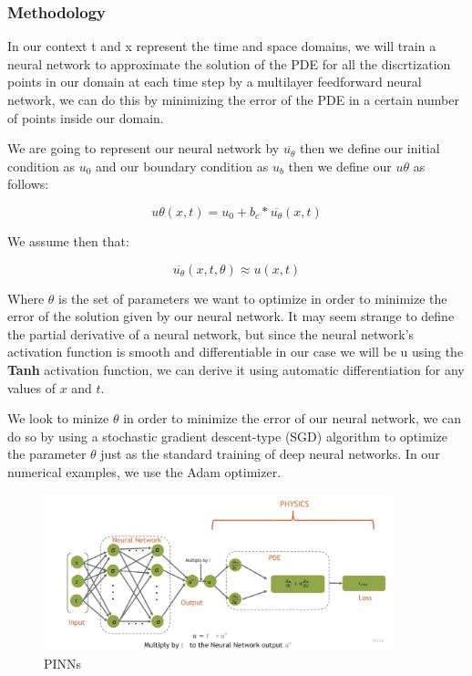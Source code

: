 \documentclass{article}
\begin{document}


\subsubsection{Methodology}

In our context t and x represent the time and space domains, we will train a neural network to approximate the solution of the PDE for all the discrtization points in our domain 
at each time step  by a multilayer feedforward neural network, we can do this by minimizing the error of the PDE in a certain number of points inside our domain.

We are going to represent our neural network by $\overline{u_\theta}$ then we define our initial condition as $u_0$ and our boundary condition as $u_b$ then we define our $u\theta$ as follows:

$$
u\theta(x,t) = u_0 + b_c * \overline{u_\theta}(x,t)
$$

We assume then that:

$$\overline{u_\theta}(x,t,\theta)\approx u(x,t)$$ 

Where $\theta$ is the set of parameters we want to optimize in order to minimize the error of the solution given by our neural network.
It may seem strange to define the partial derivative of a neural network, but since the neural network's activation function is smooth and differentiable in our case we will be u
using the \textbf{Tanh} activation function, we can derive it using automatic differentiation for any values of $x$ and $t$.

We look to minize $\theta$ in order to minimize the error of our neural network, we can do so by using  a stochastic gradient descent-type (SGD) algorithm to optimize the parameter $\theta$ just 
as the standard training of deep neural networks. In our numerical examples, we use the Adam optimizer.


\begin{figure}[H]
    \centering
    \includegraphics[width=0.9\textwidth]{images/loss.jpg}
    \caption{PINNs}
\end{figure}
\end{document}
